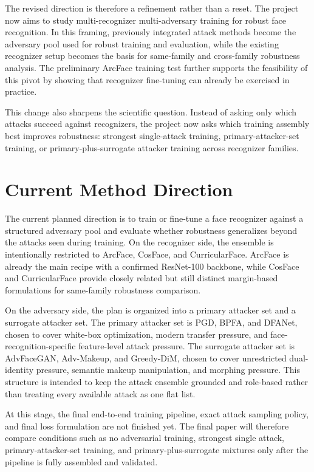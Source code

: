 \documentclass[conference]{IEEEtran}
\begin{document}
The revised direction is therefore a refinement rather than a reset. The
project now aims to study multi-recognizer multi-adversary training for robust
face recognition. In this framing, previously integrated attack methods become
the adversary pool used for robust training and evaluation, while the existing
recognizer setup becomes the basis for same-family and cross-family robustness
analysis. The preliminary ArcFace training test further supports the
feasibility of this pivot by showing that recognizer fine-tuning can already be
exercised in practice.

This change also sharpens the scientific question. Instead of asking only which
attacks succeed against recognizers, the project now asks which training
assembly best improves robustness: strongest single-attack training,
primary-attacker-set training, or primary-plus-surrogate attacker training
across recognizer families.

\section{Current Method Direction}
The current planned direction is to train or fine-tune a face recognizer
against a structured adversary pool and evaluate whether robustness
generalizes beyond the attacks seen during training. On the recognizer side,
the ensemble is intentionally restricted to ArcFace, CosFace, and
CurricularFace. ArcFace is already the main recipe with a confirmed ResNet-100
backbone, while CosFace and CurricularFace provide closely related but still
distinct margin-based formulations for same-family robustness comparison.

On the adversary side, the plan is organized into a primary attacker set and a
surrogate attacker set. The primary attacker set is PGD, BPFA, and DFANet,
chosen to cover white-box optimization, modern transfer pressure, and
face-recognition-specific feature-level attack pressure. The surrogate
attacker set is AdvFaceGAN, Adv-Makeup, and Greedy-DiM, chosen to cover
unrestricted dual-identity pressure, semantic makeup manipulation, and
morphing pressure. This structure is intended to keep the attack ensemble
grounded and role-based rather than treating every available attack as one flat
list.

At this stage, the final end-to-end training pipeline, exact attack sampling
policy, and final loss formulation are not finished yet. The final paper will
therefore compare conditions such as no adversarial training, strongest single
attack, primary-attacker-set training, and primary-plus-surrogate mixtures
only after the pipeline is fully assembled and validated.
\end{document}
